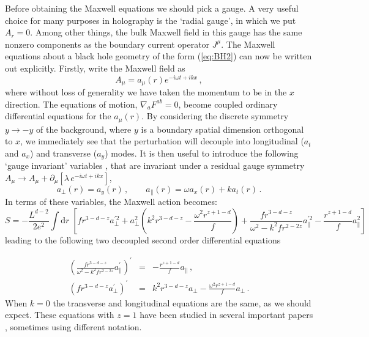 \documentclass[10pt, oneside]{book}
\let\pa=\partial
\def\be{\begin{equation}}
\def\ee{\end{equation}}
\newcommand{\bea}{\begin{eqnarray}}
\newcommand{\eea}{\end{eqnarray}}
\begin{document}
\begin{doublespace}
Before obtaining the Maxwell equations we should pick a gauge. A very useful choice for many purposes in holography is the `radial gauge', in which we put $A_r = 0$. Among other things, the bulk Maxwell field in this gauge has the same nonzero components as the boundary current operator $J^\mu$. The Maxwell equations about a black hole geometry of the form (\ref{eq:BH2}) can now be written out explicitly. Firstly, write the Maxwell field as
\be
A_\mu = a_\mu(r) e^{- i \omega t + i k x}\,, \label{eq:aform}
\ee
where without loss of generality we have taken the momentum to be in the $x$ direction. The equations of motion,
$\nabla_a F^{ab} = 0$, become coupled ordinary differential equations for the $a_\mu(r)$. By considering the discrete symmetry $y \to -y$ of the background, where $y$ is a boundary spatial dimension orthogonal to $x$, we immediately see that the perturbation will decouple into longitudinal ($a_t$ and $a_x$) and transverse ($a_y$) modes. It is then useful to introduce the following `gauge invariant' variables \cite{Kovtun:2005ev}, that are invariant under a residual gauge symmetry $A_\mu \to A_\mu + \pa_\mu [\lambda \, e^{- i \omega t + i k x}]$,
\be\label{eq:gaugeinvar}
a_\perp(r) = a_y(r) \,, \qquad a_\parallel(r) = \omega a_x(r) + k a_t(r) \,.
\ee
In terms of these variables, the Maxwell action becomes: \begin{equation}
S = -\frac{L^{d-2}}{2e^2}\int \mathrm{d}r\; \left[fr^{3-d-z}a_\perp^{\prime2} + a_\perp^2\left(k^2 r^{3-d-z}-\frac{\omega^2 r^{z+1-d}}{f}\right) + \frac{fr^{3-d-z}}{\omega^2-k^2fr^{2-2z}}a_\parallel^{\prime2} - \frac{r^{z+1-d}}{f}a_\parallel^2\right]
\end{equation}
leading to the following two decoupled second order differential equations

\bea
\left(\frac{fr^{3-d-z}}{\omega^2 - k^2 fr^{2-2z}} a_\parallel^\prime\right)^\prime &= & - \frac{r^{z+1-d}}{f}a_\parallel \,, \label{eq:ax} \\
\left(fr^{3-d-z}a_\perp^\prime\right)^\prime & = & k^2 r^{3-d-z}a_\perp - \frac{\omega^2 r^{z+1-d}}{f}a_\perp \,. \label{eq:ay}
\eea
When $k=0$ the transverse and longitudinal equations are the same, as we should expect. These equations with $z=1$ have been studied in several important papers \cite{Policastro:2002se,Herzog:2002fn, Kovtun:2005ev, Herzog:2007ij}, sometimes using different notation. 


\end{doublespace}
\end{document}
